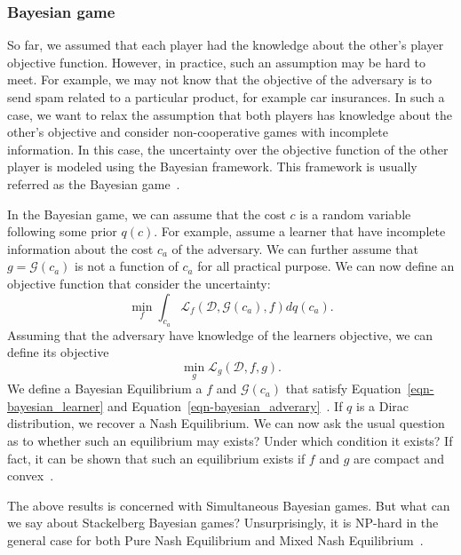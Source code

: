 \subsubsection{Bayesian game}
So far, we assumed that each player had the knowledge about the other's player objective function. However, in practice, such an assumption may be hard to meet. For example, we may  not know that the objective of the adversary is to send spam related to a particular product, for example car insurances. In such a case, we want to relax the assumption that both players has knowledge about the other's objective and consider non-cooperative games with incomplete information. In this case, the uncertainty over the objective function of the other player is modeled using the Bayesian framework. This framework is usually referred as the Bayesian game~\cite{harsanyi_bayesian_games}.

In the Bayesian game, we can assume that the cost $c$ is a random variable following some prior $q(c)$. For example, assume a learner that have incomplete information about the cost $c_a$ of the adversary. We can further assume that $g=\mathcal{G}(c_a)$ is not a function of $c_a$ for all practical purpose. We can now define an objective function that consider the uncertainty:
\begin{equation}
\label{eqn-bayesian_learner}
    \min_f\int_{c_a}\mathcal{L}_f(\mathcal{D}, \mathcal{G}(c_a), f)dq(c_a).
\end{equation}
Assuming that the adversary have knowledge of the learners objective, we can define its objective
\begin{equation}
    \label{eqn-bayesian_adverary}
    \min_g\mathcal{L}_g(\mathcal{D}, f, g).
\end{equation}
We define a Bayesian Equilibrium a $f$ and $\mathcal{G}(c_a)$ that satisfy Equation~\eqref{eqn-bayesian_learner} and Equation~\eqref{eqn-bayesian_adverary}~\cite{harsanyi_bayesian_games}. If $q$ is a Dirac distribution, we recover a Nash Equilibrium. We can now ask the usual question as to whether such an equilibrium may exists? Under which condition it exists? If fact, it can be shown that such an equilibrium exists if $f$ and $g$ are compact and convex~\cite{groshan_bayesian_reg}.

The above results is concerned with Simultaneous Bayesian games. But what can we say about Stackelberg Bayesian games? Unsurprisingly, it is NP-hard in the general case for both Pure Nash Equilibrium and Mixed Nash Equilibrium~\cite{conitzer_bayesian_game}. 

